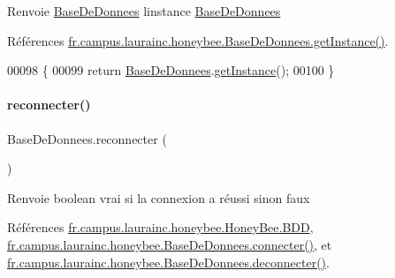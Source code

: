 \begin{DoxyReturn}{Renvoie}
\hyperlink{classfr_1_1campus_1_1laurainc_1_1honeybee_1_1_base_de_donnees}{Base\+De\+Donnees} l\textquotesingle{}instance \hyperlink{classfr_1_1campus_1_1laurainc_1_1honeybee_1_1_base_de_donnees}{Base\+De\+Donnees} 
\end{DoxyReturn}


Références \hyperlink{classfr_1_1campus_1_1laurainc_1_1honeybee_1_1_base_de_donnees_a9c2484cfb87f90e46cf878eb7803abb2}{fr.\+campus.\+laurainc.\+honeybee.\+Base\+De\+Donnees.\+get\+Instance()}.


\begin{DoxyCode}
00098     \{
00099         \textcolor{keywordflow}{return} \hyperlink{class_base_de_donnees}{BaseDeDonnees}.\hyperlink{class_base_de_donnees_a80028aa2b6b4fbf30fb2e36357b7d3d3}{getInstance}();
00100     \}
\end{DoxyCode}
\mbox{\label{classfr_1_1campus_1_1laurainc_1_1honeybee_1_1_base_de_donnees_a89357a1cc8a3648400df37a8bfe95958}} 
\paragraph{\texorpdfstring{reconnecter()}{reconnecter()}}
{\footnotesize\ttfamily Base\+De\+Donnees.\+reconnecter (\begin{DoxyParamCaption}{ }\end{DoxyParamCaption})}

\begin{DoxyReturn}{Renvoie}
boolean vrai si la connexion a réussi sinon faux 
\end{DoxyReturn}


Références \hyperlink{classfr_1_1campus_1_1laurainc_1_1honeybee_1_1_honey_bee_abfb4f6cc1c8bb793c37ccb8408abc51c}{fr.\+campus.\+laurainc.\+honeybee.\+Honey\+Bee.\+B\+DD}, \hyperlink{classfr_1_1campus_1_1laurainc_1_1honeybee_1_1_base_de_donnees_a08564ea7dccde161d6eac4b8879401bb}{fr.\+campus.\+laurainc.\+honeybee.\+Base\+De\+Donnees.\+connecter()}, et \hyperlink{classfr_1_1campus_1_1laurainc_1_1honeybee_1_1_base_de_donnees_ae022ff0b4923d637f8d392cb908aa252}{fr.\+campus.\+laurainc.\+honeybee.\+Base\+De\+Donnees.\+deconnecter()}.




